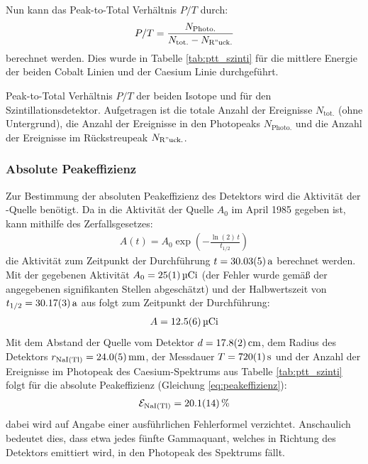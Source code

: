 \documentclass[11pt, a4paper]{article}
\numberwithin{equation}{section}
\newcommand{\co}{\isotope[60]{Co}}
\newcommand{\cs}{\isotope[137]{Cs}}
\begin{document}
Nun kann das Peak-to-Total Verhältnis $P/T$ durch:
\begin{align}
	P/T = \frac{N_\mathrm{Photo.}}{N_\mathrm{tot.} - N_\mathrm{R"uck.}}
\end{align}
berechnet werden.
Dies wurde in Tabelle \ref{tab:ptt_szinti} für die mittlere Energie der beiden Cobalt Linien und der Caesium Linie durchgeführt.
\begin{table}[ht]
	\centering
	
	\caption{Peak-to-Total Verhältnis $P/T$ der beiden Isotope \co{} und \cs{} für den Szintillationsdetektor. Aufgetragen ist die totale Anzahl der Ereignisse $N_\mathrm{tot.}$ (ohne Untergrund), die Anzahl der Ereignisse in den Photopeaks $N_\mathrm{Photo.}$ und die Anzahl der Ereignisse im Rückstreupeak $N_\mathrm{R"uck.}$.}
	\label{tab:ptt_szinti}
\end{table}



\subsubsection{Absolute Peakeffizienz}
\label{sec:absolute_peakeffizienz_szinti}
Zur Bestimmung der absoluten Peakeffizienz des Detektors wird die Aktivität der \cs{}-Quelle benötigt. Da in \cite{anleitung} die Aktivität der Quelle $A_0$ im April 1985 gegeben ist, kann mithilfe des Zerfallsgesetzes:
\begin{align}
	A(t) = A_0 \exp\left( - \frac{\ln(2)\, t}{t_{1/2}} \right)
\end{align}
die Aktivität zum Zeitpunkt der Durchführung $t = \SI{30.03 +- 0.05}{a}$ berechnet werden.
Mit der gegebenen Aktivität $A_0 = \SI{25 +- 1}{\micro Ci}$ (der Fehler wurde gemäß der angegebenen signifikanten Stellen abgeschätzt) und der Halbwertszeit von \cs{} $t_{1/2} = \SI{30.17 +- 0.03}{a}$ aus \cite{nist} folgt zum Zeitpunkt der Durchführung:
\begin{align}
	A = \SI{12.5 +- 0.6}{\micro Ci}
\end{align}
Mit dem Abstand der Quelle vom Detektor $d = \SI{17.8 +- 0.2}{cm}$, dem Radius des Detektors $r_\mathrm{NaI(Tl)} = \SI{24 +- 0.5}{mm}$, der Messdauer $T = \SI{720 +- 1}{\second}$ und der Anzahl der Ereignisse im Photopeak des Caesium-Spektrums aus Tabelle \ref{tab:ptt_szinti} folgt für die absolute Peakeffizienz (Gleichung \ref{eq:peakeffizienz}):
\begin{align}
	\mathcal{E}_\mathrm{NaI(Tl)} = \SI{20.1 +- 1.4}{\percent}
\end{align}
dabei wird auf Angabe einer ausführlichen Fehlerformel verzichtet.
Anschaulich bedeutet dies, dass etwa jedes fünfte Gammaquant, welches in Richtung des Detektors emittiert wird, in den Photopeak des Spektrums fällt.
\end{document}
